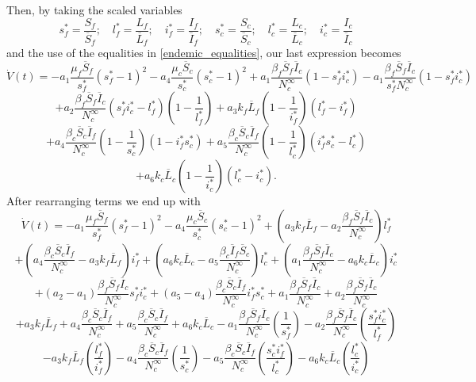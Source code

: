 \documentclass[preprint,12pt]{elsarticle}
\begin{document}
\noindent Then, by taking the scaled variables
$$
s_f^*=\frac{S_f}{\overline{S}_f};\quad l_f^*=\frac{L_f}{\overline{L}_f};\quad i_f^*=\frac{I_f}{\overline{I}_f};\quad
s_c^*=\frac{S_c}{\overline{S}_c};\quad l_c^*=\frac{L_c}{\overline{L}_c};\quad i_c^*=\frac{I_c}{\overline{I}_c}
$$
and the use of the equalities in \ref{endemic_equalities}, our last expression becomes
$$\dot{V}(t)=-a_1\frac{\mu_f\overline{S}_f}{s_f^*}\left(s_f^*-1\right)^2-a_4\frac{\mu_c\overline{S}_c}{s_c^*}\left(s_c^*-1\right)^2+a_1\frac{\beta_f\overline{S}_f\overline{I}_c}{N_c^{\infty}}(1-s_f^*i_c^*)-a_1\frac{\beta_f\overline{S}_f\overline{I}_c}{s_f^*N_c^{\infty}}(1-s_f^*i_c^*)$$
$$+a_2\frac{\beta_f\overline{S}_f\overline{I}_c}{N_c^{\infty}}\left(s_f^*i_c^*-l_f^*\right)\left(1-\frac{1}{l_f^*}\right)+a_3k_f\overline{L}_f\left(1-\frac{1}{i_f^*}\right)\left(l_f^*-i_f^*\right)$$
$$+a_4\frac{\beta_c\overline{S}_c\overline{I}_f}{N_c^{\infty}}\left(1-\frac{1}{s_c^*}\right)\left(1-i_f^*s_c^*\right)+a_5\frac{\beta_c\overline{S}_c\overline{I}_f}{N_c^{\infty}}\left(1-\frac{1}{l_c^*}\right)\left(i_f^*s_c^*-l_c^*\right)$$
$$+a_6k_c\overline{L}_c\left(1-\frac{1}{i_c^*}\right)\left(l_c^*-i_c^*\right).$$
After rearranging terms we end up with
$$\dot{V}(t)=-a_1\frac{\mu_f\overline{S}_f}{s_f^*}\left(s_f^*-1\right)^2-a_4\frac{\mu_c\overline{S}_c}{s_c^*}\left(s_c^*-1\right)^2+\left(a_3k_f\overline{L}_f-a_2\frac{\beta_f\overline{S}_f\overline{I}_c}{N_c^{\infty}}\right)l_f^*$$ 
$$+\left(a_4\frac{\beta_c\overline{S}_c\overline{I}_f}{N_c^{\infty}}-a_3k_f\overline{L}_f\right)i_f^*+\left(a_6k_c\overline{L}_c-a_5\frac{\beta_c\overline{I}_f\overline{S}_c}{N_c^{\infty}}\right)l_c^*+\left(a_1\frac{\beta_f\overline{S}_f\overline{I}_c}{N_c^{\infty}}-a_6k_c\overline{L}_c\right)i_c^*$$
$$+\left(a_2-a_1\right)\frac{\beta_f\overline{S}_f\overline{I}_c}{N_c^{\infty}}s_f^*i_c^*+\left(a_5-a_4\right)\frac{\beta_c\overline{S}_c\overline{I}_f}{N_c^{\infty}}i_f^*s_c^*+a_1\frac{\beta_f\overline{S}_f\overline{I}_c}{N_c^{\infty}}+a_2\frac{\beta_f\overline{S}_f\overline{I}_c}{N_c^{\infty}}$$
$$+a_3k_f\overline{L}_f+a_4\frac{\beta_c\overline{S}_c\overline{I}_f}{N_c^{\infty}}+a_5\frac{\beta_c\overline{S}_c\overline{I}_f}{N_c^{\infty}}+a_6k_c\overline{L}_c-a_1\frac{\beta_f\overline{S}_f\overline{I}_c}{N_c^{\infty}}\left(\frac{1}{s_f^*}\right)-a_2\frac{\beta_f\overline{S}_f\overline{I}_c}{N_c^{\infty}}\left(\frac{s_f^*i_c^*}{l_f^*}\right)$$
$$-a_3k_f\overline{L}_f\left(\frac{l_f^*}{i_f^*}\right)-a_4\frac{\beta_c\overline{S}_c\overline{I}_f}{N_c^{\infty}}\left(\frac{1}{s_c^*}\right)-a_5\frac{\beta_c\overline{S}_c\overline{I}_f}{N_c^{\infty}}\left(\frac{s_c^*i_f^*}{l_c^*}\right)-a_6k_c\overline{L}_c\left(\frac{l_c^*}{i_c^*}\right) $$
\end{document}
